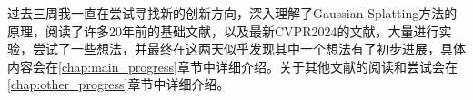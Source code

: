 过去三周我一直在尝试寻找新的创新方向，深入理解了Gaussian Splatting方法的原理，阅读了许多20年前的基础文献，以及最新CVPR2024的文献，大量进行实验，尝试了一些想法，并最终在这两天似乎发现其中一个想法有了初步进展，具体内容会在\ref{chap:main_progress}章节中详细介绍。关于其他文献的阅读和尝试会在\ref{chap:other_progress}章节中详细介绍。
